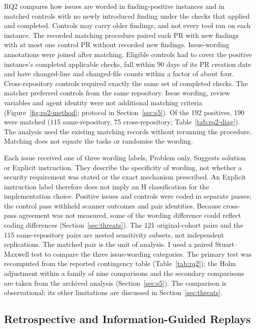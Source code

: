 \documentclass[acmsmall,screen,nonacm]{acmart}
\begin{document}
RQ2 compares how issues are worded in finding-positive instances and in matched controls with no newly introduced finding under the checks that applied and completed. Controls may carry older findings, and not every tool ran on each instance. The recorded matching procedure paired each PR with new findings with at most one control PR without recorded new findings. Issue-wording annotations were joined after matching. Eligible controls had to cover the positive instance's completed applicable checks, fall within 90 days of its PR creation date and have changed-line and changed-file counts within a factor of about four. Cross-repository controls required exactly the same set of completed checks. The matcher preferred controls from the same repository. Issue wording, review variables and agent identity were not additional matching criteria (Figure~\ref{fig:rq2-method}; protocol in Section~\ref{sec:s5}). Of the 192 positives, 190 were matched (115 same-repository, 75 cross-repository; Table~\ref{tab:rq2-diag}). The analysis used the existing matching records without rerunning the procedure. Matching does not equate the tasks or randomise the wording.

Each issue received one of three wording labels, Problem only, Suggests solution or Explicit instruction. They describe the specificity of wording, not whether a security requirement was stated or the exact mechanism prescribed. An Explicit instruction label therefore does not imply an H classification for the implementation choice. Positive issues and controls were coded in separate passes; the control pass withheld scanner outcomes and pair identities. Because cross-pass agreement was not measured, some of the wording difference could reflect coding differences (Section~\ref{sec:threats}). The 121 original-cohort pairs and the 115 same-repository pairs are nested sensitivity subsets, not independent replications. The matched pair is the unit of analysis. I used a paired Stuart--Maxwell test to compare the three issue-wording categories. The primary test was recomputed from the reported contingency table (Table~\ref{tab:rq2}); the Holm adjustment within a family of nine comparisons and the secondary comparisons are taken from the archived analysis (Section~\ref{sec:s5}). The comparison is observational; its other limitations are discussed in Section~\ref{sec:threats}.

\subsection{Retrospective and Information-Guided Replays}\label{sec:rq3-design}
\end{document}
